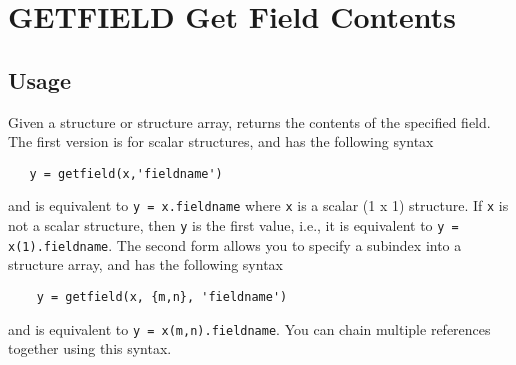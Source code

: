\section{GETFIELD Get Field Contents}

\subsection{Usage}

Given a structure or structure array, returns the contents of the
specified field.  The first version is for scalar structures, and
has the following syntax
\begin{verbatim}
   y = getfield(x,'fieldname')
\end{verbatim}
and is equivalent to \verb|y = x.fieldname| where \verb|x| is a scalar (1 x 1)
structure.  If \verb|x| is not a scalar structure, then \verb|y| is the 
first value, i.e., it is equivalent to \verb|y = x(1).fieldname|.  
The second form allows you to specify a subindex into a
structure array, and has the following syntax
\begin{verbatim}
    y = getfield(x, {m,n}, 'fieldname')
\end{verbatim}
and is equivalent to \verb|y = x(m,n).fieldname|.  You can chain multiple
references together using this syntax.
